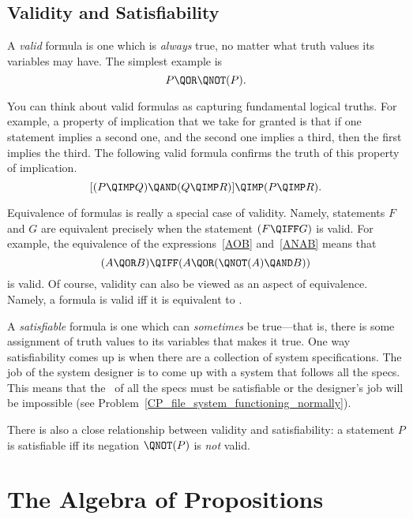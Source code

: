 \subsection{Validity and Satisfiability}
A \emph{valid}%
formula is one which is \emph{always} true, no matter
what truth values its variables may have.  The simplest example is
\[
P \QOR \QNOT(P).
\]

You can think about valid formulas as capturing fundamental logical
truths.  For example, a property of implication that we take for
granted is that if one statement implies a second one, and the second
one implies a third, then the first implies the third.  The following
valid formula confirms the truth of this property of implication.
\[
[(P \QIMP Q) \QAND (Q \QIMP R)] \QIMP (P \QIMP R).
\]

Equivalence of formulas is really a special case of validity.  Namely,
statements $F$ and $G$ are equivalent precisely when the statement $(F
\QIFF G)$ is valid.  For example, the equivalence of the
expressions~\eqref{AOB} and~\eqref{ANAB} means that
\[
(A \QOR B) \QIFF (A \QOR (\QNOT(A) \QAND B))
\]
is valid.  Of course, validity can also be viewed as an aspect of
equivalence.  Namely, a formula is valid iff it is equivalent
to \true.

A \emph{satisfiable}%
formula is one which can \emph{sometimes} be
true---that is, there is some assignment of truth values to its
variables that makes it true.  One way satisfiability comes up is when
there are a collection of system specifications.  The job of the
system designer is to come up with a system that follows all the
specs.  This means that the \QAND\ of all the specs must be
satisfiable or the designer's job will be impossible (see
Problem~\ref{CP_file_system_functioning_normally}).

There is also a close relationship between validity and
satisfiability: a statement $P$ is satisfiable iff its
negation $\QNOT(P)$ is \emph{not} valid.

\begin{problems}
\practiceproblems
{}


\classproblems
{}
\end{problems}


\section{The Algebra of Propositions}\label{prop_algebra_sec}

